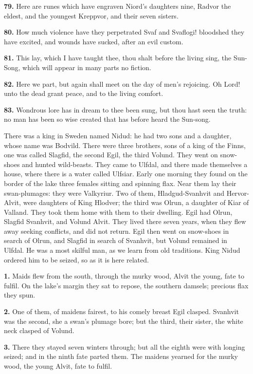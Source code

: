 \textbf{79.} Here are runes which have engraven Niord's daughters nine,
Radvor the eldest, and the youngest Kreppvor, and their seven sisters.

\textbf{80.} How much violence have they perpetrated Svaf and Svaflogi!
bloodshed they have excited, and wounds have sucked, after an evil
custom.

\textbf{81.} This lay, which I have taught thee, thou shalt before the living
sing, the Sun-Song, which will appear in many parts no fiction.

\textbf{82.} Here we part, but again shall meet on the day of men's
rejoicing. Oh Lord! unto the dead grant peace, and to the living
comfort.

\textbf{83.} Wondrous lore has in dream to thee been sung, but thou hast seen
the truth: no man has been so wise created that has before heard the
Sun-song.


There was a king in Sweden named Nidud: he had two sons and a
daughter, whose name was Bodvild. There were three brothers, sons of a
king of the Finns, one was called Slagfid, the second Egil, the third
Volund. They went on snow-shoes and hunted wild-beasts. They came to
Ulfdal, and there made themselves a house, where there is a water
called Ulfsiar. Early one morning they found on the border of the lake
three females sitting and spinning flax. Near them lay their
swan-plumages: they were Valkyriur. Two of them, Hladgud-Svanhvit and
Hervor-Alvit, were daughters of King Hlodver; the third was Olrun, a
daughter of Kiar of Valland. They took them home with them to their
dwelling. Egil had Olrun, Slagfid Svanhvit, and Volund Alvit. They
lived there seven years, when they flew away seeking conflicts, and
did not return. Egil then went on snow-shoes in search of Olrun, and
Slagfid in search of Svanhvit, but Volund remained in Ulfdal. He was a
most skilful man, as we learn from old traditions. King Nidud ordered
him to be seized, so as it is here related.

\textbf{1.} Maids flew from the south, through the murky wood, Alvit the
young, fate to fulfil. On the lake's margin they sat to repose, the
southern damsels; precious flax they spun.

\textbf{2.} One of them, of maidens fairest, to his comely breast Egil
clasped. Svanhvit was the second, she a swan's plumage bore; but the
third, their sister, the white neck clasped of Volund.

\textbf{3.} There they stayed seven winters through; but all the eighth were
with longing seized; and in the ninth fate parted them. The maidens
yearned for the murky wood, the young Alvit, fate to fulfil.

